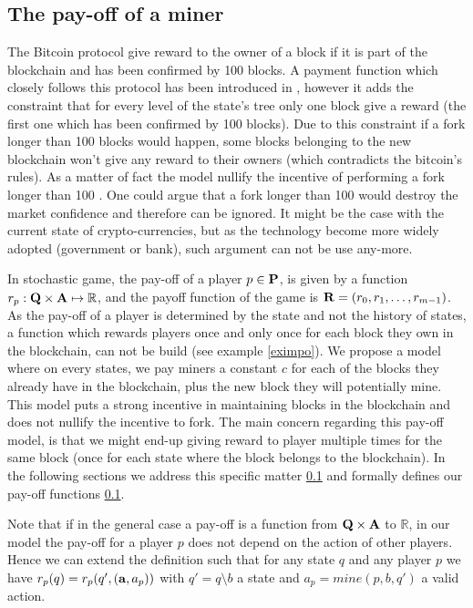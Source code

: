 \subsection{The pay-off of a miner}
The Bitcoin protocol give reward to the owner of a block if it is part of the blockchain and has been confirmed by 100 blocks. A payment function which closely follows this protocol has been introduced in \cite{}, however it adds the constraint that for every level of the state's tree only one block give a reward (the first one which has been confirmed by 100 blocks). Due to this constraint if a fork longer than 100 blocks would happen, some blocks belonging to the new blockchain won't give any reward to their owners (which contradicts the bitcoin's rules). As a matter of fact the model nullify the incentive of performing a fork longer than 100 \cite{}. One could argue that a fork longer than 100 would destroy the market confidence and therefore can be ignored. It might be the case with the current state of crypto-currencies, but as the technology become more widely adopted (government or bank), such argument can not be use any-more.

In stochastic game, the pay-off of a player $p \in \mathbf{P}$, is given by a function $r_p: \mathbf{Q} \times \mathbf{A} \mapsto \mathbb{R}$, and the payoff function of the game is $\mathbf{R} = (r_0, r_1, \ldots, r_{m-1})$.
As the pay-off of a player is determined by the state and not the history of states, a function which rewards players once and only once for each block they own in the blockchain, can not be build (see example \ref{eximpo}). We propose a model where on every states, we pay miners a constant $c$ for each of the blocks they already have in the blockchain, plus the new block they will potentially mine. This model puts a strong incentive in maintaining blocks in the blockchain and does not nullify the incentive to fork.
The main concern regarding this pay-off model, is that we might end-up giving reward to player multiple times for the same block (once for each state where the block belongs to the blockchain). In the following sections we address this specific matter \ref{} and formally defines our pay-off functions \ref{}. 

Note that if in the general case a pay-off is a function from $\mathbf{Q} \times \mathbf{A}$ to $\mathbb{R}$, in our model the pay-off for a player $p$ does not depend on the action of other players. Hence we can extend the definition such that for any state $q$ and any player $p$ we have $r_p(q) = r_p(q',(\mathbf{a},a_p))$ with $q' = q \setminus b$ a state and $a_p = mine(p,b,q')$ a valid action.  
 
